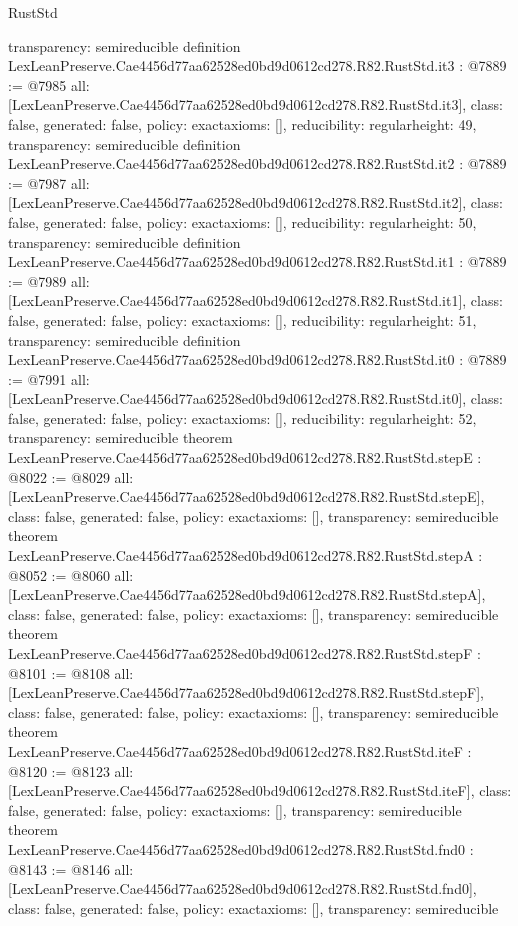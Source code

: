 \begin{lexlean}{RustStd}
\begin{coremodule}
{  transparency: semireducible
}
definition LexLeanPreserve.Cae4456d77aa62528ed0bd9d0612cd278.R82.RustStd.it3 : @7889 := @7985 {
  all: [LexLeanPreserve.Cae4456d77aa62528ed0bd9d0612cd278.R82.RustStd.it3],
  class: false,
  generated: false,
  policy: exact{axioms: []},
  reducibility: regular{height: 49},
  transparency: semireducible
}
definition LexLeanPreserve.Cae4456d77aa62528ed0bd9d0612cd278.R82.RustStd.it2 : @7889 := @7987 {
  all: [LexLeanPreserve.Cae4456d77aa62528ed0bd9d0612cd278.R82.RustStd.it2],
  class: false,
  generated: false,
  policy: exact{axioms: []},
  reducibility: regular{height: 50},
  transparency: semireducible
}
definition LexLeanPreserve.Cae4456d77aa62528ed0bd9d0612cd278.R82.RustStd.it1 : @7889 := @7989 {
  all: [LexLeanPreserve.Cae4456d77aa62528ed0bd9d0612cd278.R82.RustStd.it1],
  class: false,
  generated: false,
  policy: exact{axioms: []},
  reducibility: regular{height: 51},
  transparency: semireducible
}
definition LexLeanPreserve.Cae4456d77aa62528ed0bd9d0612cd278.R82.RustStd.it0 : @7889 := @7991 {
  all: [LexLeanPreserve.Cae4456d77aa62528ed0bd9d0612cd278.R82.RustStd.it0],
  class: false,
  generated: false,
  policy: exact{axioms: []},
  reducibility: regular{height: 52},
  transparency: semireducible
}
theorem LexLeanPreserve.Cae4456d77aa62528ed0bd9d0612cd278.R82.RustStd.stepE : @8022 := @8029 {
  all: [LexLeanPreserve.Cae4456d77aa62528ed0bd9d0612cd278.R82.RustStd.stepE],
  class: false,
  generated: false,
  policy: exact{axioms: []},
  transparency: semireducible
}
theorem LexLeanPreserve.Cae4456d77aa62528ed0bd9d0612cd278.R82.RustStd.stepA : @8052 := @8060 {
  all: [LexLeanPreserve.Cae4456d77aa62528ed0bd9d0612cd278.R82.RustStd.stepA],
  class: false,
  generated: false,
  policy: exact{axioms: []},
  transparency: semireducible
}
theorem LexLeanPreserve.Cae4456d77aa62528ed0bd9d0612cd278.R82.RustStd.stepF : @8101 := @8108 {
  all: [LexLeanPreserve.Cae4456d77aa62528ed0bd9d0612cd278.R82.RustStd.stepF],
  class: false,
  generated: false,
  policy: exact{axioms: []},
  transparency: semireducible
}
theorem LexLeanPreserve.Cae4456d77aa62528ed0bd9d0612cd278.R82.RustStd.iteF : @8120 := @8123 {
  all: [LexLeanPreserve.Cae4456d77aa62528ed0bd9d0612cd278.R82.RustStd.iteF],
  class: false,
  generated: false,
  policy: exact{axioms: []},
  transparency: semireducible
}
theorem LexLeanPreserve.Cae4456d77aa62528ed0bd9d0612cd278.R82.RustStd.fnd0 : @8143 := @8146 {
  all: [LexLeanPreserve.Cae4456d77aa62528ed0bd9d0612cd278.R82.RustStd.fnd0],
  class: false,
  generated: false,
  policy: exact{axioms: []},
  transparency: semireducible
}
\end{coremodule}
\end{lexlean}
